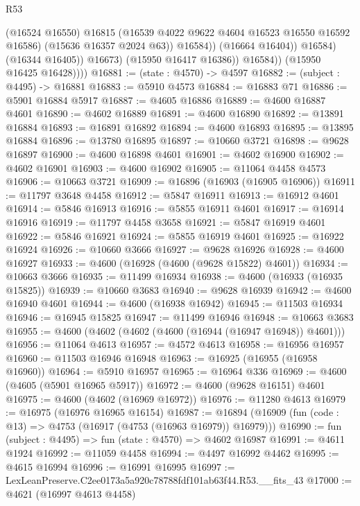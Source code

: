 \begin{lexlean}{R53}
\begin{coremodule}
                              (@16524 @16550)
                              @16815
                              (@16539 @4022 @9622 @4604 @16523 @16550 @16592 @16586)
                              (@15636 @16357 @2024 @63))
                            @16584))
                        (@16664 @16404))
                      @16584)
                    (@16344 @16405))
                  @16673)
                (@15950 @16417 @16386))
              @16584))
          (@15950 @16425 @16428))))
@16881 := (state : @4570) -> @4597
@16882 := (subject : @4495) -> @16881
@16883 := @5910 @4573
@16884 := @16883 @71
@16886 := @5901 @16884 @5917
@16887 := @4605 @16886
@16889 := @4600 @16887 @4601
@16890 := @4602 @16889
@16891 := @4600 @16890
@16892 := @13891 @16884
@16893 := @16891 @16892
@16894 := @4600 @16893
@16895 := @13895 @16884
@16896 := @13780 @16895
@16897 := @10660 @3721
@16898 := @9628 @16897
@16900 := @4600 @16898 @4601
@16901 := @4602 @16900
@16902 := @4602 @16901
@16903 := @4600 @16902
@16905 := @11064 @4458 @4573
@16906 := @10663 @3721
@16909 := @16896 (@16903 (@16905 @16906))
@16911 := @11797 @3648 @4458
@16912 := @5847 @16911
@16913 := @16912 @4601
@16914 := @5846 @16913
@16916 := @5855 @16911 @4601
@16917 := @16914 @16916
@16919 := @11797 @4458 @3658
@16921 := @5847 @16919 @4601
@16922 := @5846 @16921
@16924 := @5855 @16919 @4601
@16925 := @16922 @16924
@16926 := @10660 @3666
@16927 := @9628 @16926
@16928 := @4600 @16927
@16933 := @4600 (@16928 (@4600 (@9628 @15822) @4601))
@16934 := @10663 @3666
@16935 := @11499 @16934
@16938 := @4600 (@16933 (@16935 @15825))
@16939 := @10660 @3683
@16940 := @9628 @16939
@16942 := @4600 @16940 @4601
@16944 := @4600 (@16938 @16942)
@16945 := @11503 @16934
@16946 := @16945 @15825
@16947 := @11499 @16946
@16948 := @10663 @3683
@16955 := @4600 (@4602 (@4602 (@4600 (@16944 (@16947 @16948)) @4601)))
@16956 := @11064 @4613
@16957 := @4572 @4613
@16958 := @16956 @16957
@16960 := @11503 @16946 @16948
@16963 := @16925 (@16955 (@16958 @16960))
@16964 := @5910 @16957
@16965 := @16964 @336
@16969 := @4600 (@4605 (@5901 @16965 @5917))
@16972 := @4600 (@9628 @16151) @4601
@16975 := @4600 (@4602 (@16969 @16972))
@16976 := @11280 @4613
@16979 := @16975 (@16976 @16965 @16154)
@16987 := @16894 (@16909 (fun (code : @13) => @4753 (@16917 (@4753 (@16963 @16979)) @16979)))
@16990 := fun (subject : @4495) => fun (state : @4570) => @4602 @16987
@16991 := @4611 @1924
@16992 := @11059 @4458
@16994 := @4497 @16992 @4462
@16995 := @4615 @16994
@16996 := @16991 @16995
@16997 := LexLeanPreserve.C2ee0173a5a920c78788fdf101ab63f44.R53.__fits_43
@17000 := @4621 (@16997 @4613 @4458)

\end{coremodule}
\end{lexlean}
